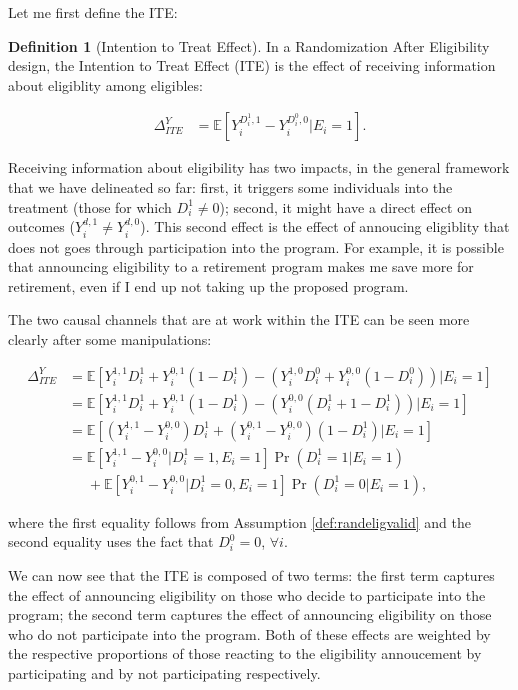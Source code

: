 \documentclass[
]{book}
\newcommand{\esp}[1]{\mathbb{E}[ #1 ]}
\theoremstyle{definition}
\newtheorem{definition}{Definition}[chapter]
\theoremstyle{definition}
\theoremstyle{definition}
\theoremstyle{definition}
\theoremstyle{remark}
\begin{document}
Let me first define the ITE:

\begin{definition}[Intention to Treat Effect]
\protect\hypertarget{def:ITE}{}{\label{def:ITE} \iffalse (Intention to Treat Effect) \fi{} }In a Randomization After Eligibility design, the Intention to Treat Effect (ITE) is the effect of receiving information about eligiblity among eligibles:

\begin{align*}
  \Delta^Y_{ITE} & = \esp{Y_i^{D_i^1,1}-Y_i^{D_i^0,0}|E_i=1}.
\end{align*}
\end{definition}

Receiving information about eligibility has two impacts, in the general framework that we have delineated so far: first, it triggers some individuals into the treatment (those for which \(D_i^1\neq0\)); second, it might have a direct effect on outcomes (\(Y_i^{d,1}\neq Y_i^{d,0}\)).
This second effect is the effect of annoucing eligiblity that does not goes through participation into the program.
For example, it is possible that announcing eligibility to a retirement program makes me save more for retirement, even if I end up not taking up the proposed program.

The two causal channels that are at work within the ITE can be seen more clearly after some manipulations:

\begin{align}
  \Delta^Y_{ITE} & = \esp{Y_i^{1,1}D^1_i+Y_i^{0,1}(1-D_i^1)-(Y_i^{1,0}D^0_i+Y_i^{0,0}(1-D_i^0))|E_i=1}\nonumber \\
                & = \esp{Y_i^{1,1}D^1_i+Y_i^{0,1}(1-D_i^1)-(Y_i^{0,0}(D_i^1+1-D_i^1))|E_i=1}\nonumber \\
                & = \esp{(Y_i^{1,1}-Y_i^{0,0})D^1_i+(Y_i^{0,1}-Y_i^{0,0})(1-D_i^1)|E_i=1}\nonumber \\
                & = \esp{Y_i^{1,1}-Y_i^{0,0}|D^1_i=1,E_i=1}\Pr(D^1_i=1|E_i=1)\nonumber \\
                & \phantom{=}+\esp{Y_i^{0,1}-Y_i^{0,0}|D_i^1=0,E_i=1}\Pr(D_i^1=0|E_i=1),\label{eq:ITE2}
\end{align}

where the first equality follows from Assumption \ref{def:randeligvalid} and the second equality uses the fact that \(D_i^0=0\), \(\forall i\).

We can now see that the ITE is composed of two terms: the first term captures the effect of announcing eligibility on those who decide to participate into the program; the second term captures the effect of announcing eligibility on those who do not participate into the program.
Both of these effects are weighted by the respective proportions of those reacting to the eligibility annoucement by participating and by not participating respectively.
\end{document}
